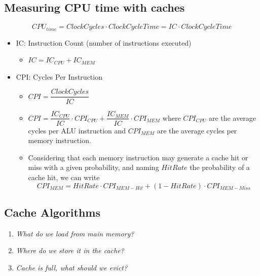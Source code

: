 \subsection{Measuring CPU time with caches}
\begin{equation}
   CPU_{time} = ClockCycles \cdot ClockCycleTime = IC \cdot ClockCycleTime
\end{equation}
\begin{itemize}
   \item IC: Instruction Count (number of instructions executed)
   \begin{itemize}
      \item $IC = IC_{CPU} + IC_{MEM}$
   \end{itemize}
   \item CPI: Cycles Per Instruction
   \begin{itemize}
      \item $CPI = \dfrac{ClockCycles}{IC}$
      \item $CPI = \dfrac{IC_{CPU}}{IC} \cdot CPI_{CPU} + \dfrac{IC_{MEM}}{IC} \cdot CPI_{MEM}$ where $CPI_{CPU}$ are the average cycles per ALU instruction and $CPI_{MEM}$ are the average cycles per memory instruction.
      \item Considering that each memory instruction may generate a cache hit or miss with a given probability, and naming $HitRate$ the probability of a cache hit, we can write 
      \begin{equation}
         CPI_{MEM} = HitRate \cdot CPI_{MEM - Hit} + (1-HitRate) \cdot CPI_{MEM - Miss}
      \end{equation}
   \end{itemize}
\end{itemize} 

\subsection{Cache Algorithms}
\begin{enumerate}
   \item \textit{What do we load from main memory?}
   \item \textit{Where do we store it in the cache?}
   \item \textit{Cache is full, what should we evict?}
\end{enumerate}
